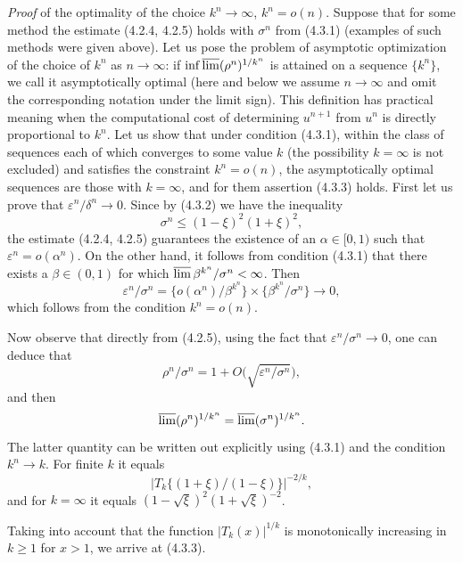 \documentclass[11pt,oneside]{book}
\begin{document}
\textit{Proof} of the optimality of the choice $k^n \to \infty$, $k^n = o(n)$. Suppose that for some method the estimate (4.2.4, 4.2.5) holds with $\sigma^n$ from (4.3.1) (examples of such methods were given above). Let us pose the problem of asymptotic optimization of the choice of $k^n$ as $n \to \infty$: if $\inf \varlimsup (\rho^n)^{1/k^n}$ is attained on a sequence $\{k^n\}$, we call it asymptotically optimal (here and below we assume $n \to \infty$ and omit the corresponding notation under the limit sign). This definition has practical meaning when the computational cost of determining $u^{n+1}$ from $u^n$ is directly proportional to $k^n$. Let us show that under condition (4.3.1), within the class of sequences each of which converges to some value $k$ (the possibility $k = \infty$ is not excluded) and satisfies the constraint $k^n = o(n)$, the asymptotically optimal sequences are those with $k = \infty$, and for them assertion (4.3.3) holds. %
First let us prove that $\varepsilon^n / \delta^n \to 0$. %
Since by (4.3.2) we have the inequality
\[
\sigma^n \leqslant (1 - \xi)^2 (1 + \xi)^2, %
\]
the estimate (4.2.4, 4.2.5) guarantees the existence of an $\alpha \in [0, 1)$ such that $\varepsilon^n = o(\alpha^n)$. On the other hand, it follows from condition (4.3.1) that
there exists a $\beta \in (0, 1)$ for which $\varlimsup \beta^{k^n} / \sigma^n < \infty$. Then
\[
\varepsilon^n / \sigma^n = \bigl\{o(\alpha^n) / \beta^{k^n}\bigr\} \times \bigl\{\beta^{k^n} / \sigma^n\bigr\} \to 0,
\]
which follows from the condition $k^n = o(n)$.

Now observe that directly from (4.2.5), using the fact that $\varepsilon^n / \sigma^n \to 0$, one can deduce that
\[
\rho^n / \sigma^n = 1 + O\bigl(\sqrt{\varepsilon^n / \sigma^n}\bigr),
\]
and then
\[
\varlimsup (\rho^n)^{1/k^n} = \varlimsup (\sigma^n)^{1/k^n}.
\]
The latter quantity can be written out explicitly using (4.3.1) and the condition $k^n \to k$. For finite $k$ it equals
\[
\bigl|T_k\bigl\{(1 + \xi)/(1 - \xi)\bigr\}\bigr|^{-2/k},
\]
and for $k = \infty$ it equals $(1 - \sqrt{\xi})^2 (1 + \sqrt{\xi})^{-2}$.

Taking into account that the function $|T_k(x)|^{1/k}$ is monotonically increasing in $k \geqslant 1$ for $x > 1$, we arrive at (4.3.3). %
\end{document}
